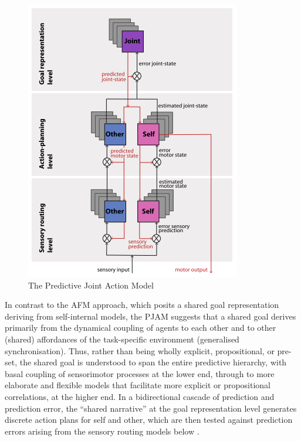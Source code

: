 \begin{CJK}{UTF8}{gbsn}
  \begin{figure}[htbp]
    \begin{center}
      \includegraphics[scale=.8]{images/PJAM.png}
        \caption{The Predictive Joint Action Model \citep{Pesquita2017}}
          \label{fig:PJAM}
     \end{center}
  \end{figure}

In contrast to the AFM approach, which posits a shared goal representation deriving from self-internal models, the PJAM suggests that a shared goal derives primarily from the dynamical coupling of agents to each other and to other (shared) affordances of the task-specific environment (generalised synchronisation).  Thus, rather than being wholly explicit, propositional, or pre-set, the shared goal is understood to span the entire predictive hierarchy, with basal coupling of sensorimotor processes at the lower end, through to more elaborate and flexible models that facilitate more explicit or propositional correlations, at the higher end.  In a bidirectional cascade of prediction and prediction error, the ``shared narrative'' at the goal representation level generates discrete action plans for self and other, which are then tested against prediction errors arising from the sensory routing models below \citep{Pesquita2017}.


\end{CJK}
